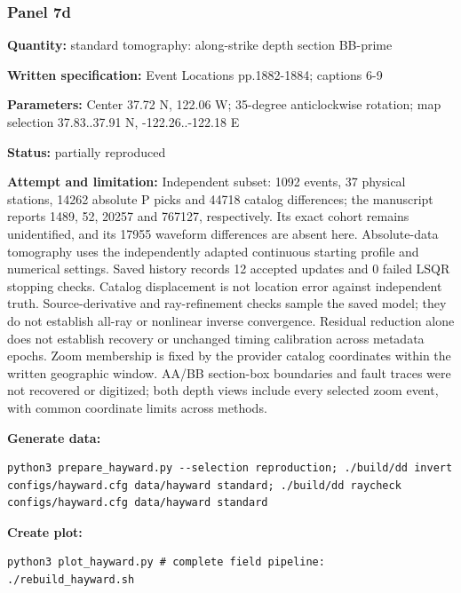 \subsubsection*{Panel 7d}
\noindent\textbf{Quantity:} standard tomography: along-strike depth section BB-prime\par
\noindent\textbf{Written specification:} Event Locations pp.1882-1884; captions 6-9\par
\noindent\textbf{Parameters:} Center 37.72 N, 122.06 W; 35-degree anticlockwise rotation; map selection 37.83..37.91 N, -122.26..-122.18 E\par
\noindent\textbf{Status:} partially reproduced\par
\noindent\textbf{Attempt and limitation:} Independent subset: 1092 events, 37 physical stations, 14262 absolute P picks and 44718 catalog differences; the manuscript reports 1489, 52, 20257 and 767127, respectively. Its exact cohort remains unidentified, and its 17955 waveform differences are absent here. Absolute-data tomography uses the independently adapted continuous starting profile and numerical settings. Saved history records 12 accepted updates and 0 failed LSQR stopping checks. Catalog displacement is not location error against independent truth. Source-derivative and ray-refinement checks sample the saved model; they do not establish all-ray or nonlinear inverse convergence. Residual reduction alone does not establish recovery or unchanged timing calibration across metadata epochs. Zoom membership is fixed by the provider catalog coordinates within the written geographic window. AA/BB section-box boundaries and fault traces were not recovered or digitized; both depth views include every selected zoom event, with common coordinate limits across methods.\par
\noindent\textbf{Generate data:}
\begin{lstlisting}
python3 prepare_hayward.py --selection reproduction; ./build/dd invert configs/hayward.cfg data/hayward standard; ./build/dd raycheck configs/hayward.cfg data/hayward standard
\end{lstlisting}
\noindent\textbf{Create plot:}
\begin{lstlisting}
python3 plot_hayward.py # complete field pipeline: ./rebuild_hayward.sh
\end{lstlisting}
